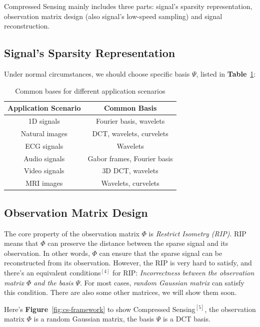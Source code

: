 \documentclass[10pt,a4paper,oneside,numbers=noenddot]{scrbook}
\newcommand*{\figref}[1]{\textbf{Figure}~\ref{#1}}
\newcommand*{\tabref}[1]{\textbf{Table}~\ref{#1}}
\theoremstyle{ctplain}
\theoremstyle{ctresult}
\begin{document}
Compressed Sensing mainly includes three parts: signal's sparsity representation, observation
matrix design (also signal's low-speed sampling) and signal reconstruction.

\subsection{Signal's Sparsity Representation}

Under normal circumstances, we should choose specific basis $\Psi$, listed in
\tabref{tab:sparsity-bases}:

\begin{table}[H]
  \centering
  \begin{tabular}{|c|c|}
    \hline
    Application Scenario & Common Basis \\
    \hline
    1D signals      & Fourier basis, wavelets             \\
    Natural images  & DCT, wavelets, curvelets            \\
    ECG signals     & Wavelets                            \\
    Audio signals   & Gabor frames, Fourier basis         \\
    Video signals   & 3D DCT, wavelets                    \\
    MRI images      & Wavelets, curvelets                 \\
    \hline
  \end{tabular}
  \caption{Common bases for different application scenarios}
  \label{tab:sparsity-bases}
\end{table}

\subsection{Observation Matrix Design}

The core property of the observation matrix $\Phi$ is \emph{Restrict Isometry (RIP)}.
RIP means that $\Phi$ can preserve the distance between the sparse signal and its
observation. In other words, $\Phi$ can ensure that the sparse signal can be reconstructed
from its observation. However, the RIP is very hard to satisfy, and there's an equivalent
conditions$^{[4]}$ for RIP: \emph{Incorrectness between the observation matrix $\Phi$ and
the basis $\Psi$}. For most cases, \emph{random Gaussian matrix} can satisfy this
condition. There are also some other matrices, we will show them soon.

Here's \figref{fig:cs-framework} to show Compressed Sensing$^{[5]}$, the observation matrix $\Phi$ is a
random Gaussian matrix, the basis $\Psi$ is a DCT basis.
\end{document}
